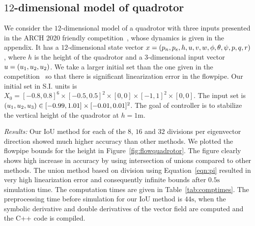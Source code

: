 \subsection{$12$-dimensional model of quadrotor}
We consider the $12$-dimensional model of a quadrotor with three
inputs presented in the ARCH 2020 friendly
competition~\cite{geretti2020arch}, whose dynamics is given in the
appendix.  It has a $12$-dimensional state vector $x
= \left(p_n,p_e,h,u,v,w,\phi,\theta,\psi,p,q,r\right)$, where $h$ is the
height of the quadrotor and a $3$-dimensional input vector $u
= \left(u_1,u_2,u_2\right)$.  We take a larger initial set than the one given
in the competition~\cite{geretti2020arch} so that there is significant
linearization error in the flowpipe.  Our initial set in S.I. units
is $X_0 = [-0.8,0.8]^6\times[-0.5,0.5]^2\times[0,0]\times
[-1,1]^2\times[0,0]$.  The input set is $\left(u_1,u_2,u_3\right)\in
[-0.99,1.01]\times[-0.01,0.01]^2$.  The goal of controller is to
stabilize the vertical height of the quadrotor at $h = 1\si{\meter}$.

  

\emph{Results:}  Our IoU method for each of the $8$, $16$ and $32$ divisions per
  eigenvector direction showed much higher accuracy than other
  methods.  We plotted the flowpipe bounds for the height in
  Figure~\ref{fig:flowquadrotor}.  The figure clearly shows high
  increase in accuracy by using intersection of unions compared to
  other methods.  The union method based on division using
  Equation~\ref{eqn:pi} resulted in very high linearization error and
  consequently infinite bounds after $0.5\si{\second}$ simulation
  time.  The computation times are given in Table~\ref{tab:comptimes}.
  The preprocessing time before simulation for our IoU method is
  $44\si{\second}$, when the symbolic derivative and double
  derivatives of the vector field are computed and the C++ code is compiled.
%

